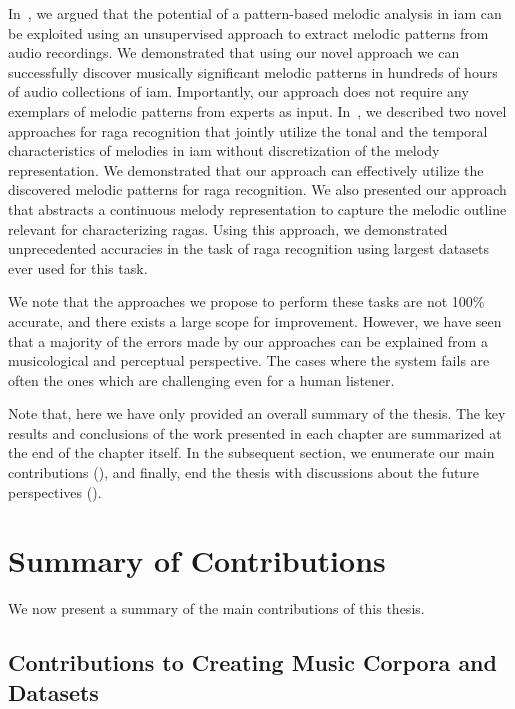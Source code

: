 In~, we argued that the potential of a pattern-based melodic analysis in \gls{iam} can be exploited using an unsupervised approach to extract melodic patterns from audio recordings. We demonstrated that using our novel approach we can successfully discover musically significant melodic patterns in hundreds of hours of audio collections of \gls{iam}. Importantly, our approach does not require any exemplars of melodic patterns from experts as input. In~, we described two novel approaches for \gls{raga} recognition that jointly utilize the tonal and the temporal characteristics of melodies in \gls{iam} without discretization of the melody representation. We demonstrated that our approach can effectively utilize the discovered melodic patterns for \gls{raga} recognition. We also presented our approach that abstracts a continuous melody representation to capture the melodic outline relevant for characterizing \glspl{raga}. Using this approach, we demonstrated unprecedented accuracies in the task of \gls{raga} recognition using largest datasets ever used for this task. 

We note that the approaches we propose to perform these tasks are not 100\% accurate, and there exists a large scope for improvement. However, we have seen that a majority of the errors made by our approaches can be explained from a musicological and perceptual perspective. The cases where the system fails are often the ones which are challenging even for a human listener. 

Note that, here we have only provided an overall summary of the thesis. The key results and conclusions of the work presented in each chapter are summarized at the end of the chapter itself. In the subsequent section, we enumerate our main contributions (), and finally, end the thesis with discussions about the future perspectives (). 


\section{Summary of Contributions}
\label{sec:summary_contributions}
We now present a summary of the main contributions of this thesis.

\subsection*{Contributions to Creating Music Corpora and Datasets}

